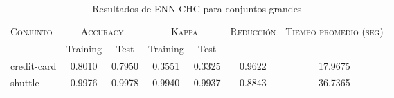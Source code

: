 \begin{table}[]
\centering
\begin{tabular}{l c c c c c c}
\hline
\multirow{2}{*}{\textsc{Conjunto}}
	& \multicolumn{2}{c}{\textsc{Accuracy}}
	& \multicolumn{2}{c}{\textsc{Kappa}}
	& \textsc{Reducción}
	& \textsc{Tiempo promedio (seg)} \\
	& Training & Test
	& Training & Test \\ 
\hline
\hline

credit-card & 0.8010 & 0.7950 & 0.3551 & 0.3325 & 0.9622 & 17.9675 \\
shuttle & 0.9976 & 0.9978 & 0.9940 & 0.9937 & 0.8843 & 36.7365 \\

\hline
\end{tabular}
\caption{Resultados de ENN-CHC para conjuntos grandes }
\label{res-grande-ENN-CHC}
\end{table}

